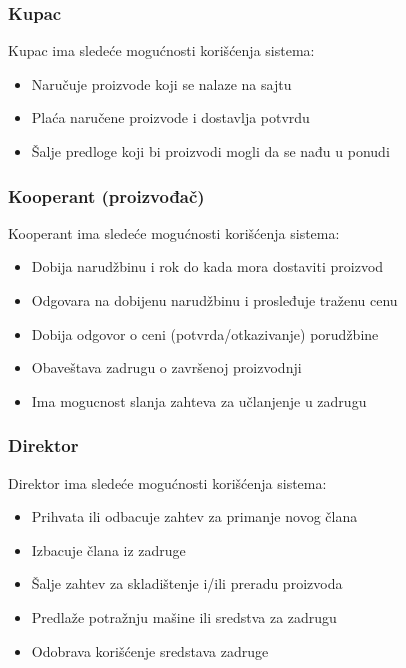\documentclass[a4paper, oneside]{article}
\begin{document}
\subsubsection{Kupac}
\indent Kupac ima sledeće mogućnosti korišćenja sistema:
\begin{itemize}
    \item Naručuje proizvode koji se nalaze na sajtu
    \item Plaća naručene proizvode i dostavlja potvrdu
    \item Šalje predloge koji bi proizvodi mogli da se nađu u ponudi
\end{itemize}

\subsubsection{Kooperant (proizvođač)}
\indent Kooperant ima sledeće mogućnosti korišćenja sistema:
\begin{itemize}
    \item Dobija narudžbinu i rok do kada mora dostaviti proizvod
    \item Odgovara na dobijenu narudžbinu i prosleđuje traženu cenu
    \item Dobija odgovor o ceni (potvrda/otkazivanje) porudžbine
    \item Obaveštava zadrugu o završenoj proizvodnji
    \item Ima mogucnost slanja zahteva za učlanjenje u zadrugu
\end{itemize}

\subsubsection{Direktor}
\indent Direktor ima sledeće mogućnosti korišćenja sistema:
\begin{itemize}
    \item Prihvata ili odbacuje zahtev za primanje novog člana
    \item Izbacuje člana iz zadruge
    \item Šalje zahtev za skladištenje i/ili preradu proizvoda
    \item Predlaže potražnju mašine ili sredstva za zadrugu
    \item Odobrava korišćenje sredstava zadruge
\end{itemize}

\end{document}
